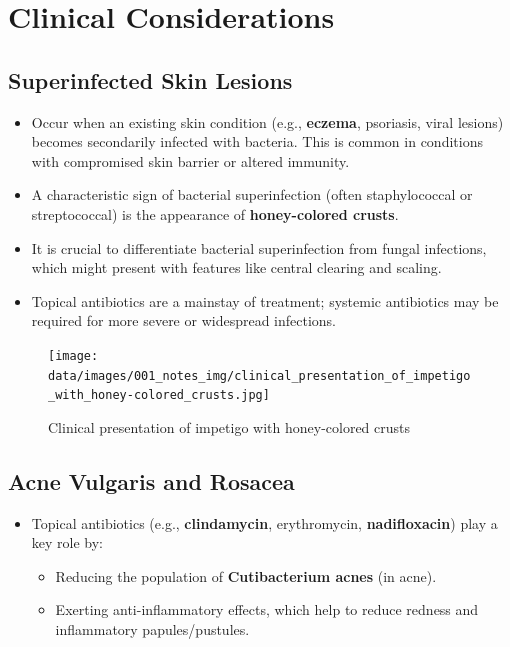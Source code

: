 \documentclass{article}
\begin{document}
\section*{Clinical Considerations}

\subsection*{Superinfected Skin Lesions}
\begin{itemize}
    \item Occur when an existing skin condition (e.g., \textbf{eczema}, psoriasis, viral lesions) becomes secondarily infected with bacteria. This is common in conditions with compromised skin barrier or altered immunity.
    \item A characteristic sign of bacterial superinfection (often staphylococcal or streptococcal) is the appearance of \textbf{honey-colored crusts}.
    \item It is crucial to differentiate bacterial superinfection from fungal infections, which might present with features like central clearing and scaling.
    \item Topical antibiotics are a mainstay of treatment; systemic antibiotics may be required for more severe or widespread infections.
\end{itemize}

\begin{figure}[h]
    \centering
    \texttt{[image: data/images/001\_notes\_img/clinical\_presentation\_of\_impetigo\_with\_honey-colored\_crusts.jpg]}
    \caption{Clinical presentation of impetigo with honey-colored crusts}
    \label{fig:clinical_presentation_of_impetigo_with_honey-colored_crusts}
\end{figure}

\subsection*{Acne Vulgaris and Rosacea}
\begin{itemize}
    \item Topical antibiotics (e.g., \textbf{clindamycin}, erythromycin, \textbf{nadifloxacin}) play a key role by:
    \begin{itemize}
        \item Reducing the population of \textbf{Cutibacterium acnes} (in acne).
        \item Exerting anti-inflammatory effects, which help to reduce redness and inflammatory papules/pustules.
    \end{itemize}
\end{itemize}
\end{document}
